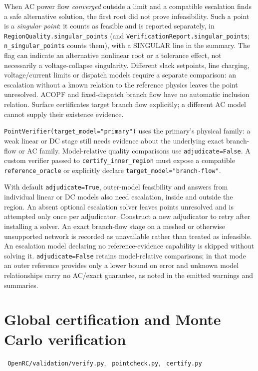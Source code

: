 \documentclass[11pt,a4paper]{report}
\newcommand{\code}[1]{\texttt{\small #1}}
\newcommand{\file}[1]{\texttt{\small\color{nbgrey} #1}}
\begin{document}
When AC power flow \emph{converged} outside a limit and a compatible escalation
finds a safe alternative solution, the first root did not prove infeasibility.
Such a point is a \emph{singular point}: it counts as feasible and is
reported separately, in \code{RegionQuality.singular\_points} (and
\code{VerificationReport.singular\_points}; \code{n\_singular\_points} counts
them), with a SINGULAR line in the summary. The flag can indicate an alternative
nonlinear root or a tolerance effect, not necessarily a voltage-collapse
singularity. Different slack setpoints, line charging, voltage/current limits
or dispatch models require a separate comparison: an escalation without a
known relation to the reference physics leaves the point unresolved.
ACOPF and fixed-dispatch branch flow have no automatic inclusion relation.
Surface certificates target branch flow explicitly; a different AC model
cannot supply their existence evidence.

\code{PointVerifier(target\_model="primary")} uses the primary's physical
family: a weak linear or DC stage still needs evidence about the underlying
exact branch-flow or AC family. Model-relative quality comparisons use
\code{adjudicate=False}. A custom verifier passed to
\code{certify\_inner\_region} must expose a compatible
\code{reference\_oracle} or explicitly declare
\code{target\_model="branch-flow"}.

With default \code{adjudicate=True}, outer-model feasibility and answers
from individual linear or DC models also need escalation, inside and outside
the region. An absent optional escalation solver leaves points unresolved
and is attempted only once per adjudicator. Construct a new adjudicator to
retry after installing a solver.
An exact branch-flow stage on a meshed or otherwise unsupported network is
recorded as unavailable rather than treated as infeasible. An escalation model
declaring no reference-evidence capability is skipped without solving it.
\code{adjudicate=False} retains model-relative comparisons; in that mode an
outer reference provides only a lower bound on error and unknown model
relationships carry no AC/exact guarantee, as noted in the emitted warnings and
summaries.

\section{Global certification and Monte Carlo verification}
\label{sec:verify}

\file{OpenRC/validation/verify.py}, \file{pointcheck.py}, \file{certify.py}
\end{document}
